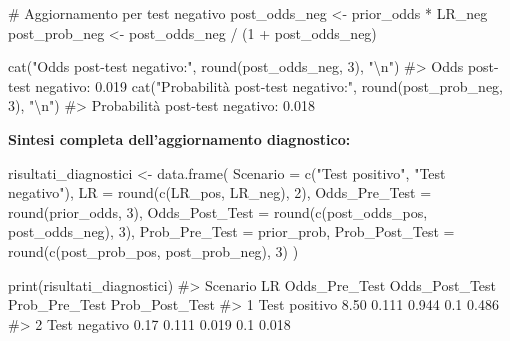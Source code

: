\documentclass[
  letterpaper,
  DIV=11,
  numbers=noendperiod,
  oneside]{scrreprt}
\newenvironment{Shaded}{\begin{snugshade}}{\end{snugshade}}
\newcommand{\AttributeTok}[1]{\textcolor[rgb]{0.40,0.45,0.13}{#1}}
\newcommand{\CommentTok}[1]{\textcolor[rgb]{0.37,0.37,0.37}{#1}}
\newcommand{\DecValTok}[1]{\textcolor[rgb]{0.68,0.00,0.00}{#1}}
\newcommand{\FunctionTok}[1]{\textcolor[rgb]{0.28,0.35,0.67}{#1}}
\newcommand{\NormalTok}[1]{\textcolor[rgb]{0.00,0.23,0.31}{#1}}
\newcommand{\OtherTok}[1]{\textcolor[rgb]{0.00,0.23,0.31}{#1}}
\newcommand{\SpecialCharTok}[1]{\textcolor[rgb]{0.37,0.37,0.37}{#1}}
\newcommand{\StringTok}[1]{\textcolor[rgb]{0.13,0.47,0.30}{#1}}
\theoremstyle{definition}
\theoremstyle{plain}
\theoremstyle{definition}
\theoremstyle{remark}
\begin{document}
\begin{Shaded}
\begin{Highlighting}[]
\CommentTok{\# Aggiornamento per test negativo}
\NormalTok{post\_odds\_neg }\OtherTok{\textless{}{-}}\NormalTok{ prior\_odds }\SpecialCharTok{*}\NormalTok{ LR\_neg}
\NormalTok{post\_prob\_neg }\OtherTok{\textless{}{-}}\NormalTok{ post\_odds\_neg }\SpecialCharTok{/}\NormalTok{ (}\DecValTok{1} \SpecialCharTok{+}\NormalTok{ post\_odds\_neg)}

\FunctionTok{cat}\NormalTok{(}\StringTok{"Odds post{-}test negativo:"}\NormalTok{, }\FunctionTok{round}\NormalTok{(post\_odds\_neg, }\DecValTok{3}\NormalTok{), }\StringTok{"}\SpecialCharTok{\textbackslash{}n}\StringTok{"}\NormalTok{)}
\CommentTok{\#\textgreater{} Odds post{-}test negativo: 0.019}
\FunctionTok{cat}\NormalTok{(}\StringTok{"Probabilità post{-}test negativo:"}\NormalTok{, }\FunctionTok{round}\NormalTok{(post\_prob\_neg, }\DecValTok{3}\NormalTok{), }\StringTok{"}\SpecialCharTok{\textbackslash{}n}\StringTok{"}\NormalTok{)}
\CommentTok{\#\textgreater{} Probabilità post{-}test negativo: 0.018}
\end{Highlighting}
\end{Shaded}

\textbf{Sintesi completa dell'aggiornamento diagnostico:}

\begin{Shaded}
\begin{Highlighting}[]
\NormalTok{risultati\_diagnostici }\OtherTok{\textless{}{-}} \FunctionTok{data.frame}\NormalTok{(}
  \AttributeTok{Scenario =} \FunctionTok{c}\NormalTok{(}\StringTok{"Test positivo"}\NormalTok{, }\StringTok{"Test negativo"}\NormalTok{),}
  \AttributeTok{LR =} \FunctionTok{round}\NormalTok{(}\FunctionTok{c}\NormalTok{(LR\_pos, LR\_neg), }\DecValTok{2}\NormalTok{),}
  \AttributeTok{Odds\_Pre\_Test =} \FunctionTok{round}\NormalTok{(prior\_odds, }\DecValTok{3}\NormalTok{),}
  \AttributeTok{Odds\_Post\_Test =} \FunctionTok{round}\NormalTok{(}\FunctionTok{c}\NormalTok{(post\_odds\_pos, post\_odds\_neg), }\DecValTok{3}\NormalTok{),}
  \AttributeTok{Prob\_Pre\_Test =}\NormalTok{ prior\_prob,}
  \AttributeTok{Prob\_Post\_Test =} \FunctionTok{round}\NormalTok{(}\FunctionTok{c}\NormalTok{(post\_prob\_pos, post\_prob\_neg), }\DecValTok{3}\NormalTok{)}
\NormalTok{)}

\FunctionTok{print}\NormalTok{(risultati\_diagnostici)}
\CommentTok{\#\textgreater{}        Scenario   LR Odds\_Pre\_Test Odds\_Post\_Test Prob\_Pre\_Test Prob\_Post\_Test}
\CommentTok{\#\textgreater{} 1 Test positivo 8.50         0.111          0.944           0.1          0.486}
\CommentTok{\#\textgreater{} 2 Test negativo 0.17         0.111          0.019           0.1          0.018}
\end{Highlighting}
\end{Shaded}
\end{document}
